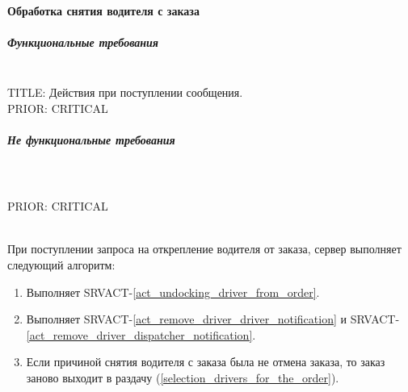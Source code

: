 \paragraph{Обработка снятия водителя с заказа} \label{remove_driver_from_order}

    \subparagraph{Функциональные требования} \mbox{}\\

      TITLE: Действия при поступлении сообщения.
     	\\
      PRIOR: CRITICAL\\

    \subparagraph{Не функциональные требования} \mbox{}\\

      \\
      PRIOR: CRITICAL\\


    	\begin{alg}  \label{remove_driver_from_order_alg} \mbox{}\\

        При поступлении запроса на открепление водителя от заказа, сервер выполняет следующий алгоритм:

        \begin{enumerate}
          \item Выполняет SRVACT-\ref{act_undocking_driver_from_order}.
          \item Выполняет SRVACT-\ref{act_remove_driver_driver_notification} и SRVACT-\ref{act_remove_driver_dispatcher_notification}.
          \item Если причиной снятия водителя с заказа была не отмена заказа, то заказ заново выходит в раздачу (\ref{selection_drivers_for_the_order}).
        \end{enumerate}
      \end{alg}

